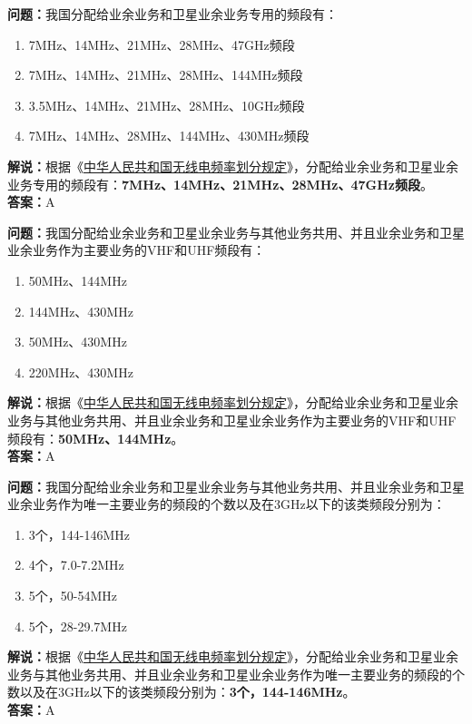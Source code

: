 \textbf{问题：}我国分配给业余业务和卫星业余业务专用的频段有：
\begin{enumerate}[label=\Alph*), leftmargin=1cm]
  \item 7MHz、14MHz、21MHz、28MHz、47GHz频段
  \item 7MHz、14MHz、21MHz、28MHz、144MHz频段
  \item 3.5MHz、14MHz、21MHz、28MHz、10GHz频段
  \item 7MHz、14MHz、28MHz、144MHz、430MHz频段
\end{enumerate}
\textbf{解说：}根据《\href{https://www.miit.gov.cn/zwgk/zcwj/wjfb/txy/art/2020/art_066386284cd2449493586c81ccafed11.html}{中华人民共和国无线电频率划分规定}》，分配给业余业务和卫星业余业务专用的频段有：\textbf{7MHz、14MHz、21MHz、28MHz、47GHz频段}。\\\textbf{答案：}A%

\textbf{问题：}我国分配给业余业务和卫星业余业务与其他业务共用、并且业余业务和卫星业余业务作为主要业务的VHF和UHF频段有：
\begin{enumerate}[label=\Alph*), leftmargin=1cm]
  \item 50MHz、144MHz
  \item 144MHz、430MHz
  \item 50MHz、430MHz
  \item 220MHz、430MHz
\end{enumerate}
\textbf{解说：}根据《\href{https://www.miit.gov.cn/zwgk/zcwj/wjfb/txy/art/2020/art_066386284cd2449493586c81ccafed11.html}{中华人民共和国无线电频率划分规定}》，分配给业余业务和卫星业余业务与其他业务共用、并且业余业务和卫星业余业务作为主要业务的VHF和UHF频段有：\textbf{50MHz、144MHz}。\\\textbf{答案：}A%

\textbf{问题：}我国分配给业余业务和卫星业余业务与其他业务共用、并且业余业务和卫星业余业务作为唯一主要业务的频段的个数以及在3GHz以下的该类频段分别为：
\begin{enumerate}[label=\Alph*), leftmargin=1cm]
  \item 3个，144-146MHz
  \item 4个，7.0-7.2MHz
  \item 5个，50-54MHz
  \item 5个，28-29.7MHz
\end{enumerate}
\textbf{解说：}根据《\href{https://www.miit.gov.cn/zwgk/zcwj/wjfb/txy/art/2020/art_066386284cd2449493586c81ccafed11.html}{中华人民共和国无线电频率划分规定}》，分配给业余业务和卫星业余业务与其他业务共用、并且业余业务和卫星业余业务作为唯一主要业务的频段的个数以及在3GHz以下的该类频段分别为：\textbf{3个，144-146MHz}。\\\textbf{答案：}A%

